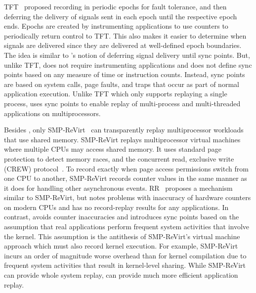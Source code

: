 TFT~\cite{bressoud-tft} proposed recording in periodic epochs for
fault tolerance, and then deferring the delivery of signals 
sent in each epoch until the respective epoch ends.  Epochs are
created by instrumenting applications to use counters to periodically
return control to TFT.  This also makes it easier to determine when
signals are delivered since they are delivered at well-defined epoch
boundaries.  The idea is similar to \scribe{}'s notion of deferring
signal delivery until sync points.  But, unlike TFT, \scribe{}
does not require instrumenting applications and does not define sync
points based on any measure of time or instruction counts.  Instead,
sync points are based on system calls, page faults, and traps that
occur as part of normal application execution.  Unlike TFT which only
supports replaying a single process, \scribe{} uses sync points to
enable replay of multi-process and multi-threaded applications on
multiprocessors. 

Besides \scribe{}, only SMP-ReVirt~\cite{smp-revirt} can transparently
replay multiprocessor workloads that use shared memory.
SMP-ReVirt replays multiprocessor virtual machines where multiple CPUs
may access shared memory.  It uses standard page protection to detect
memory races, and the concurrent read, exclusive write (CREW)
protocol~\cite{crew,instant-replay}.  To record exactly when page
access permissions switch from one CPU to another, SMP-ReVirt records
counter values in the same manner as it does for handling other
asynchronous events.  RR~\cite{rr} proposes a mechanism similar to
SMP-ReVirt, but notes problems with inaccuracy of hardware counters on
modern CPUs and has no record-replay results for any applications.
In contrast, \scribe{} avoids counter inaccuracies and introduces sync
points based on the 
assumption that real
applications perform frequent system activities that involve the
kernel.  This assumption is the antithesis of SMP-ReVirt's virtual
machine approach which must also record kernel execution.
For example, SMP-ReVirt incurs an order of magnitude worse
overhead than \scribe{} for kernel compilation due to frequent system
activities that result in kernel-level sharing.  While SMP-ReVirt can
provide whole system replay, \scribe{} can provide much more efficient
application replay.   
